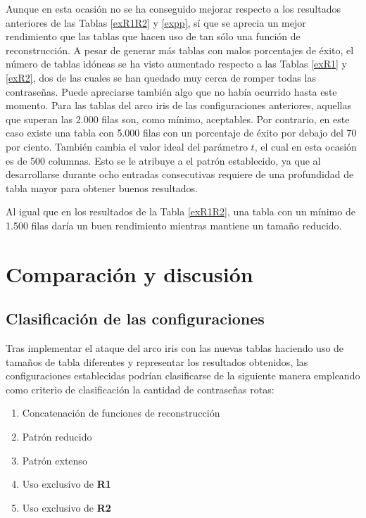 \documentclass[12pt,spanish,listoffigures,listoftables,listofalgorithms]{tfgetsinf}
\begin{document}
Aunque en esta ocasión no se ha conseguido mejorar respecto a los resultados anteriores de las Tablas \ref{exR1R2} y \ref{expp}, sí que se aprecia un mejor rendimiento que las tablas que hacen uso de tan sólo una función de reconstrucción. A pesar de generar más tablas con malos porcentajes de éxito, el número de tablas idóneas se ha visto aumentado respecto a las Tablas \ref{exR1} y \ref{exR2}, dos de las cuales se han quedado muy cerca de romper todas las contraseñas. Puede apreciarse también algo que no había ocurrido hasta este momento. Para las tablas del arco iris de las configuraciones anteriores, aquellas que superan las 2.000 filas son, como mínimo, aceptables. Por contrario, en este caso existe una tabla con 5.000 filas con un porcentaje de éxito por debajo del 70 por ciento. También cambia el valor ideal del parámetro $t$, el cual en esta ocasión es de 500 columnas. Esto se le atribuye a el patrón establecido, ya que al desarrollarse durante ocho entradas consecutivas requiere de una profundidad de tabla mayor para obtener buenos resultados.

Al igual que en los resultados de la Tabla \ref{exR1R2}, una tabla con un mínimo de 1.500 filas daría un buen rendimiento mientras mantiene un tamaño reducido.

\section{Comparación y discusión}

\subsection{Clasificación de las configuraciones} \label{clasificación}

Tras implementar el ataque del arco iris con las nuevas tablas haciendo uso de tamaños de tabla diferentes y representar los resultados obtenidos, las configuraciones establecidas podrían clasificarse de la siguiente manera empleando como criterio de clasificación la cantidad de contraseñas rotas:

\begin{enumerate}

    \item Concatenación de funciones de reconstrucción
    
    \item Patrón reducido
    
    \item Patrón extenso
    
    \item Uso exclusivo de \textbf{R1}
    
    \item Uso exclusivo de \textbf{R2}
    
\end{enumerate}
\end{document}
